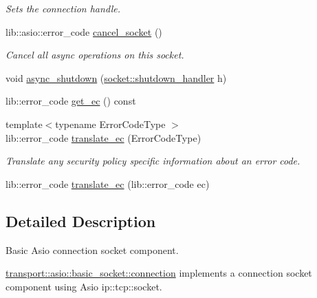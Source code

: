 \begin{DoxyCompactItemize}
\begin{DoxyCompactList}\small\item\em Sets the connection handle. \end{DoxyCompactList}\item 
lib\+::asio\+::error\+\_\+code \hyperlink{classwebsocketpp_1_1transport_1_1asio_1_1basic__socket_1_1connection_aaf1e0b99023c2653ebbe7953c874cc6d}{cancel\+\_\+socket} ()
\begin{DoxyCompactList}\small\item\em Cancel all async operations on this socket. \end{DoxyCompactList}\item 
void \hyperlink{classwebsocketpp_1_1transport_1_1asio_1_1basic__socket_1_1connection_ac82ce93dad13c5b909367c75a3195759}{async\+\_\+shutdown} (\hyperlink{namespacewebsocketpp_1_1transport_1_1asio_1_1socket_a864ed8b0d8fa1a92a5f016c112efc4ad}{socket\+::shutdown\+\_\+handler} h)
\item 
lib\+::error\+\_\+code \hyperlink{classwebsocketpp_1_1transport_1_1asio_1_1basic__socket_1_1connection_a4d178034a56b1f2669da2a44d66e31f8}{get\+\_\+ec} () const 
\item 
{\footnotesize template$<$typename Error\+Code\+Type $>$ }\\lib\+::error\+\_\+code \hyperlink{classwebsocketpp_1_1transport_1_1asio_1_1basic__socket_1_1connection_a3ce50f4cb485ca4e98577f9f7af4b635}{translate\+\_\+ec} (Error\+Code\+Type)
\begin{DoxyCompactList}\small\item\em Translate any security policy specific information about an error code. \end{DoxyCompactList}\item 
lib\+::error\+\_\+code \hyperlink{classwebsocketpp_1_1transport_1_1asio_1_1basic__socket_1_1connection_a92b3f3132f48c3b57f48514557f6e653}{translate\+\_\+ec} (lib\+::error\+\_\+code ec)
\end{DoxyCompactItemize}


\subsection{Detailed Description}
Basic Asio connection socket component. 

\hyperlink{classwebsocketpp_1_1transport_1_1asio_1_1basic__socket_1_1connection}{transport\+::asio\+::basic\+\_\+socket\+::connection} implements a connection socket component using Asio ip\+::tcp\+::socket. 

